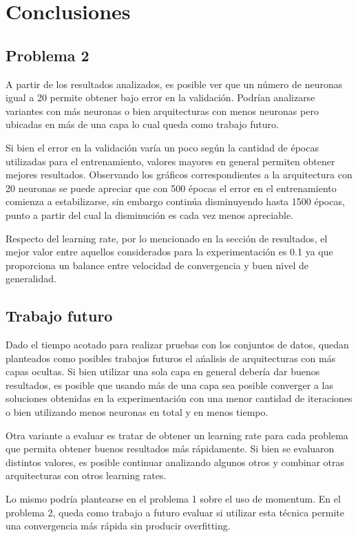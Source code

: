 \documentclass[informe.tex]{subfiles}
\begin{document}
  
  \section{Conclusiones}
  
  
    \subsection{Problema 2}
      
      A partir de los resultados analizados, es posible ver que un número de neuronas igual a 20 permite obtener bajo error en la validación. Podrían analizarse variantes con más neuronas o bien arquitecturas con menos neuronas pero ubicadas en más de una capa lo cual queda como trabajo futuro.
      
      Si bien el error en la validación varía un poco según la cantidad de épocas utilizadas para el entrenamiento, valores mayores en general permiten obtener mejores resultados. Observando los gráficos correspondientes a la arquitectura con 20 neuronas se puede apreciar que con 500 épocas el error en el entrenamiento comienza a estabilizarse, sin embargo continúa disminuyendo hasta 1500 épocas, punto a partir del cual la disminución es cada vez menos apreciable.
      
      Respecto del learning rate, por lo mencionado en la sección de resultados, el mejor valor entre aquellos considerados para la experimentación es 0.1 ya que proporciona un balance entre velocidad de convergencia y buen nivel de generalidad.
  
    \subsection{Trabajo futuro}
    
      Dado el tiempo acotado para realizar pruebas con los conjuntos de datos, quedan planteados como posibles trabajos futuros el ańalisis de arquitecturas con más capas ocultas. Si bien utilizar una sola capa en general debería dar buenos resultados, es posible que usando más de una capa sea posible converger a las soluciones obtenidas en la experimentación con una menor cantidad de iteraciones o bien utilizando menos neuronas en total y en menos tiempo.
      
      Otra variante a evaluar es tratar de obtener un learning rate para cada problema que permita obtener buenos resultados m\'as r\'apidamente. Si bien se evaluaron distintos valores, es posible continuar analizando algunos otros y combinar otras arquitecturas con otros learning rates.
      
      Lo mismo podría plantearse en el problema 1 sobre el uso de momentum. En el problema 2, queda como trabajo a futuro evaluar si utilizar esta técnica permite una convergencia más rápida sin producir overfitting.
\end{document}

